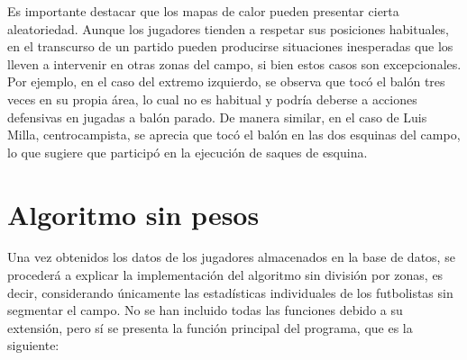 Es importante destacar que los mapas de calor pueden presentar cierta aleatoriedad. Aunque los jugadores tienden a respetar sus posiciones habituales, en el transcurso de un partido pueden producirse situaciones inesperadas que los lleven a intervenir en otras zonas del campo, si bien estos casos son excepcionales. Por ejemplo, en el caso del extremo izquierdo, se observa que tocó el balón tres veces en su propia área, lo cual no es habitual y podría deberse a acciones defensivas en jugadas a balón parado. De manera similar, en el caso de Luis Milla, centrocampista, se aprecia que tocó el balón en las dos esquinas del campo, lo que sugiere que participó en la ejecución de saques de esquina.

\section{Algoritmo sin pesos}

Una vez obtenidos los datos de los jugadores almacenados en la base de datos, se procederá a explicar la implementación del algoritmo sin división por zonas, es decir, considerando únicamente las estadísticas individuales de los futbolistas sin segmentar el campo. No se han incluido todas las funciones debido a su extensión, pero sí se presenta la función principal del programa, que es la siguiente:

